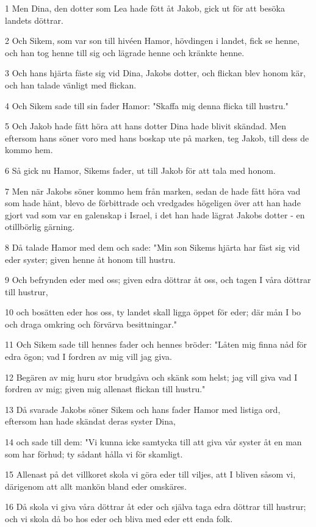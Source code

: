 \par 1 Men Dina, den dotter som Lea hade fött åt Jakob, gick ut för att besöka landets döttrar.
\par 2 Och Sikem, som var son till hivéen Hamor, hövdingen i landet, fick se henne, och han tog henne till sig och lägrade henne och kränkte henne.
\par 3 Och hans hjärta fäste sig vid Dina, Jakobs dotter, och flickan blev honom kär, och han talade vänligt med flickan.
\par 4 Och Sikem sade till sin fader Hamor: "Skaffa mig denna flicka till hustru."
\par 5 Och Jakob hade fått höra att hans dotter Dina hade blivit skändad. Men eftersom hans söner voro med hans boskap ute på marken, teg Jakob, till dess de kommo hem.
\par 6 Så gick nu Hamor, Sikems fader, ut till Jakob för att tala med honom.
\par 7 Men när Jakobs söner kommo hem från marken, sedan de hade fått höra vad som hade hänt, blevo de förbittrade och vredgades högeligen över att han hade gjort vad som var en galenskap i Israel, i det han hade lägrat Jakobs dotter - en otillbörlig gärning.
\par 8 Då talade Hamor med dem och sade: "Min son Sikems hjärta har fäst sig vid eder syster; given henne åt honom till hustru.
\par 9 Och befrynden eder med oss; given edra döttrar åt oss, och tagen I våra döttrar till hustrur,
\par 10 och bosätten eder hos oss, ty landet skall ligga öppet för eder; där mån I bo och draga omkring och förvärva besittningar."
\par 11 Och Sikem sade till hennes fader och hennes bröder: "Låten mig finna nåd för edra ögon; vad I fordren av mig vill jag giva.
\par 12 Begären av mig huru stor brudgåva och skänk som helst; jag vill giva vad I fordren av mig; given mig allenast flickan till hustru."
\par 13 Då svarade Jakobs söner Sikem och hans fader Hamor med listiga ord, eftersom han hade skändat deras syster Dina,
\par 14 och sade till dem: "Vi kunna icke samtycka till att giva vår syster åt en man som har förhud; ty sådant hålla vi för skamligt.
\par 15 Allenast på det villkoret skola vi göra eder till viljes, att I bliven såsom vi, därigenom att allt mankön bland eder omskäres.
\par 16 Då skola vi giva våra döttrar åt eder och själva taga edra döttrar till hustrur; och vi skola då bo hos eder och bliva med eder ett enda folk.
